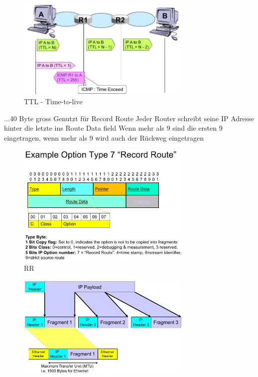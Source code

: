 \documentclass[ngerman,a4paper,12pt]{scrreprt}
\begin{document}
\begin{figure}[H]
	\centering
	\includegraphics[width=0.75\textwidth]{img/V9.5.jpg}
	\caption{TTL - Time-to-live}
	\label{}
\end{figure}

\ul
	...40 Byte gross
	\li Genutzt für Record Route \ra Jeder Router schreibt seine IP Adresse hinter die letzte ins Route Data field
	\li Wenn mehr als 9 sind die ersten 9 eingetragen, wenn mehr als 9 wird auch der Rückweg eingetragen
\ulE

\begin{figure}[H]
	\centering
	\includegraphics[width=0.75\textwidth]{img/V9.6.jpg}
	\caption{RR}
	\label{}
\end{figure}


\begin{figure}[H]
	\centering
	\includegraphics[width=0.75\textwidth]{img/V9.7.jpg}
	\caption{}
	\label{}
\end{figure}
\end{document}
